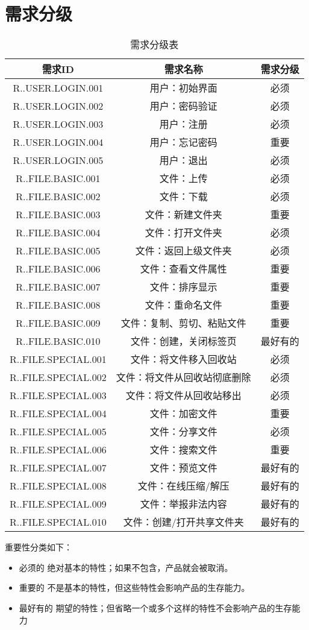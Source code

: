 \chapter{需求分级}
\begin{table}[htbp]
\centering
\caption{需求分级表} \label{tab:classification}
\begin{tabular}{|c|c|c|}
    \hline
    需求ID & 需求名称 & 需求分级 \\
    \hline
    R..USER.LOGIN.001 & 用户：初始界面 & 必须 \\
    \hline
    R..USER.LOGIN.002 & 用户：密码验证 & 必须 \\
    \hline 
    R..USER.LOGIN.003 & 用户：注册 & 必须 \\
    \hline
    R..USER.LOGIN.004 & 用户：忘记密码 & 重要 \\
    \hline
    R..USER.LOGIN.005 & 用户：退出 & 必须 \\
    \hline
    R..FILE.BASIC.001 & 文件：上传 & 必须 \\
    \hline
    R..FILE.BASIC.002 & 文件：下载 & 必须 \\
    \hline
    R..FILE.BASIC.003 & 文件：新建文件夹 & 重要 \\
    \hline
    R..FILE.BASIC.004 & 文件：打开文件夹 & 必须 \\
    \hline
    R..FILE.BASIC.005 & 文件：返回上级文件夹 & 必须 \\
    \hline
    R..FILE.BASIC.006 & 文件：查看文件属性 & 重要 \\
    \hline
    R..FILE.BASIC.007 & 文件：排序显示 & 重要 \\
    \hline
    R..FILE.BASIC.008 & 文件：重命名文件 & 重要 \\
    \hline
    R..FILE.BASIC.009 & 文件：复制、剪切、粘贴文件 & 重要 \\
    \hline
    R..FILE.BASIC.010 & 文件：创建，关闭标签页 & 最好有的 \\
    \hline
    R..FILE.SPECIAL.001 & 文件：将文件移入回收站 & 必须 \\
    \hline
    R..FILE.SPECIAL.002 & 文件：将文件从回收站彻底删除 & 必须 \\
    \hline
    R..FILE.SPECIAL.003 & 文件：将文件从回收站移出 & 必须 \\
    \hline
    R..FILE.SPECIAL.004 & 文件：加密文件 & 重要 \\
    \hline
    R..FILE.SPECIAL.005 & 文件：分享文件 & 必须 \\
    \hline
    R..FILE.SPECIAL.006 & 文件：搜索文件 & 重要 \\
    \hline
    R..FILE.SPECIAL.007 & 文件：预览文件 & 最好有的 \\
    \hline
    R..FILE.SPECIAL.008 & 文件：在线压缩/解压 & 最好有的 \\
    \hline
    R..FILE.SPECIAL.009 & 文件：举报非法内容 & 最好有的 \\
    \hline
    R..FILE.SPECIAL.010 & 文件：创建/打开共享文件夹 & 最好有的 \\
    \hline
\end{tabular}
\end{table}

重要性分类如下：
\begin{itemize}
\item 必须的		绝对基本的特性；如果不包含，产品就会被取消。
\item 重要的		不是基本的特性，但这些特性会影响产品的生存能力。
\item 最好有的		期望的特性；但省略一个或多个这样的特性不会影响产品的生存能力
\end{itemize}
